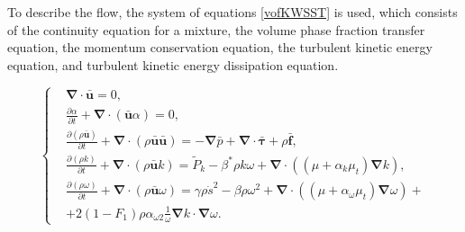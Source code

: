 \documentclass[sensors,article,submit,moreauthors,pdftex]{Definitions/mdpi}
\begin{document}
To describe the flow, the system of equations \eqref{vofKWSST} is used, which consists of the continuity equation for a mixture, the volume phase fraction transfer equation, the momentum conservation equation, the turbulent kinetic energy equation, and turbulent kinetic energy dissipation equation.

\begin{equation}
	\label{vofKWSST}
	\left\{
		\begin{aligned}
			&\boldsymbol{\nabla} \cdot \bar{\boldsymbol{u}} = 0,\\
			&\frac{\partial \alpha}{\partial t} + \boldsymbol{\nabla} \cdot (\bar{\boldsymbol{u}} \alpha) = 0,\\
			&\frac{\partial (\rho \bar{\boldsymbol{u}})}{\partial t} + \boldsymbol{\nabla} \cdot (\rho \bar{\boldsymbol{u}} \bar{\boldsymbol{u}}) = -\boldsymbol{\nabla} \bar{p} + \boldsymbol{\nabla} \cdot \bar{\boldsymbol{\tau}} + \rho \bar{\boldsymbol{f}},\\
			&\frac{\partial (\rho k)}{\partial t} + \boldsymbol{\nabla} \cdot (\rho \bar{\boldsymbol{u}} k) = \widetilde{P}_k - \beta^*\rho k \omega + \boldsymbol{\nabla} \cdot \left( (\mu + \alpha_k \mu_t) \boldsymbol{\nabla} k \right),\\
			&\frac{\partial (\rho \omega)}{\partial t}  + \boldsymbol{\nabla} \cdot ( \rho \bar{\boldsymbol{u}} \omega) = \gamma \rho \dot{s}^2 - \beta \rho \omega^2 + \boldsymbol{\nabla} \cdot \left( (\mu + \alpha_\omega \mu_t) \boldsymbol{\nabla} \omega \right) + \\
			&+2 (1 - F_1) \rho \alpha_{\omega 2} \frac{1}{\omega} \boldsymbol{\nabla} k \cdot \boldsymbol{\nabla} \omega.
		\end{aligned}
	\right.
\end{equation} 
\end{document}
